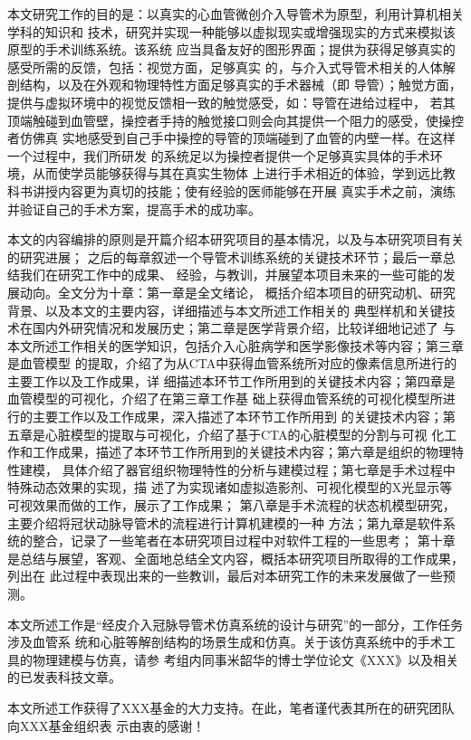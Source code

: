 
本文研究工作的目的是：以真实的心血管微创介入导管术为原型，利用计算机相关学科的知识和
技术，研究并实现一种能够以虚拟现实或增强现实的方式来模拟该原型的手术训练系统。该系统
应当具备友好的图形界面；提供为获得足够真实的感受所需的反馈，包括：视觉方面，足够真实
的，与介入式导管术相关的人体解剖结构，以及在外观和物理特性方面足够真实的手术器械（即
导管）；触觉方面，提供与虚拟环境中的视觉反馈相一致的触觉感受，如：导管在进给过程中，
若其顶端触碰到血管壁，操控者手持的触觉接口则会向其提供一个阻力的感受，使操控者仿佛真
实地感受到自己手中操控的导管的顶端碰到了血管的内壁一样。在这样一个过程中，我们所研发
的系统足以为操控者提供一个足够真实具体的手术环境，从而使学员能够获得与其在真实生物体
上进行手术相近的体验，学到远比教科书讲授内容更为真切的技能；使有经验的医师能够在开展
真实手术之前，演练并验证自己的手术方案，提高手术的成功率。

本文的内容编排的原则是开篇介绍本研究项目的基本情况，以及与本研究项目有关的研究进展；
之后的每章叙述一个导管术训练系统的关键技术环节；最后一章总结我们在研究工作中的成果、
经验，与教训，并展望本项目未来的一些可能的发展动向。全文分为十章：第一章是全文绪论，
概括介绍本项目的研究动机、研究背景、以及本文的主要内容，详细描述与本文所述工作相关的
典型样机和关键技术在国内外研究情况和发展历史；第二章是医学背景介绍，比较详细地记述了
与本文所述工作相关的医学知识，包括介入心脏病学和医学影像技术等内容；第三章是血管模型
的提取，介绍了为从CTA中获得血管系统所对应的像素信息所进行的主要工作以及工作成果，详
细描述本环节工作所用到的关键技术内容；第四章是血管模型的可视化，介绍了在第三章工作基
础上获得血管系统的可视化模型所进行的主要工作以及工作成果，深入描述了本环节工作所用到
的关键技术内容；第五章是心脏模型的提取与可视化，介绍了基于CTA的心脏模型的分割与可视
化工作和工作成果，描述了本环节工作所用到的关键技术内容；第六章是组织的物理特性建模，
具体介绍了器官组织物理特性的分析与建模过程；第七章是手术过程中特殊动态效果的实现，描
述了为实现诸如虚拟造影剂、可视化模型的X光显示等可视效果而做的工作，展示了工作成果；
第八章是手术流程的状态机模型研究，主要介绍将冠状动脉导管术的流程进行计算机建模的一种
方法；第九章是软件系统的整合，记录了一些笔者在本研究项目过程中对软件工程的一些思考；
第十章是总结与展望，客观、全面地总结全文内容，概括本研究项目所取得的工作成果，列出在
此过程中表现出来的一些教训，最后对本研究工作的未来发展做了一些预测。

本文所述工作是“经皮介入冠脉导管术仿真系统的设计与研究”的一部分，工作任务涉及血管系
统和心脏等解剖结构的场景生成和仿真。关于该仿真系统中的手术工具的物理建模与仿真，请参
考组内同事米韶华的博士学位论文《XXX》以及相关的已发表科技文章。

本文所述工作获得了XXX基金的大力支持。在此，笔者谨代表其所在的研究团队向XXX基金组织表
示由衷的感谢！ 